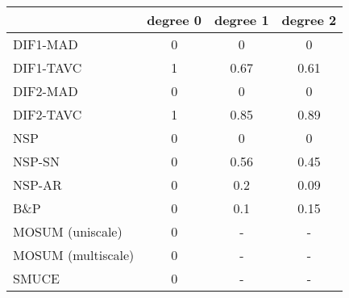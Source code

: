 \begin{tabular}{|l|c|c|c|}
  \hline
 & degree 0 & degree 1 & degree 2 \\ 
  \hline
DIF1-MAD & 0 & 0 & 0 \\ 
  DIF1-TAVC & 1 & 0.67 & 0.61 \\ 
  DIF2-MAD & 0 & 0 & 0 \\ 
  DIF2-TAVC & 1 & 0.85 & 0.89 \\ 
  NSP & 0 & 0 & 0 \\ 
  NSP-SN & 0 & 0.56 & 0.45 \\ 
  NSP-AR & 0 & 0.2 & 0.09 \\ 
  B\&P & 0 & 0.1 & 0.15 \\ 
  MOSUM (uniscale) & 0 & - & - \\ 
  MOSUM (multiscale) & 0 & - & - \\ 
  SMUCE & 0 & - & - \\ 
   \hline
\end{tabular}
